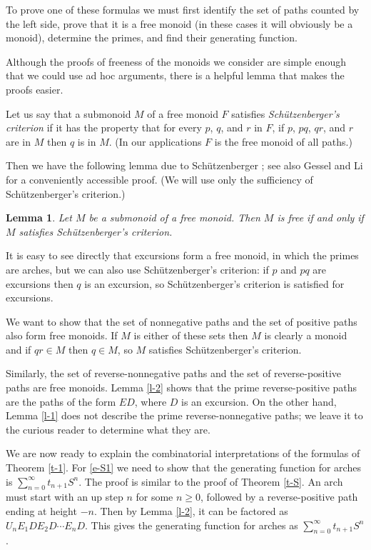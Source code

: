 \documentclass[12pt,reqno, oneside]{amsart}
\newtheorem{lem}[thm]{Lemma}
\newcommand{\Sch}{Sch\"utzenberger}
\begin{document}
To prove one of these formulas we must first identify the set of paths counted by the left side, prove that it is a free monoid (in these cases it will obviously be a monoid),  determine the primes, and find their generating function.

Although the proofs of freeness of the monoids we consider are simple enough that we could use ad hoc arguments, there is a helpful lemma that makes the proofs easier.

Let us say that a submonoid $M$ of a free monoid $F$ satisfies \emph{Sch\"utzenberger's criterion} if it has the property that for every $p$, $q$, and $r$ in $F$, if $p$, $pq$, $qr$, and $r$ are in $M$ then $q$ is in $M$. (In our applications $F$ is the free monoid of all paths.)

Then we have the following lemma due to Sch\"utzenberger \cite[Theorem 1.4]{schutzenberger}; see also Gessel and Li \cite[Lemma 3]{gl} for a conveniently accessible proof.  (We will  use only the sufficiency of Sch\"utzenberger's criterion.)
\begin{lem}
\label{l-schutz}
Let $M$ be a submonoid of a free monoid.
Then $M$ is free if and only if $M$ satisfies Sch\"utzenberger's criterion.
\end{lem}

It is easy to see directly that excursions form a free monoid, in which the primes are arches, but we can also use Sch\"utzenberger's criterion: if $p$ and $pq$ are excursions then $q$ is an excursion, so \Sch's criterion is satisfied for excursions.

We want to show that the set of nonnegative paths and the set of positive paths also form free monoids. If $M$ is either of these sets then $M$ is clearly a monoid and  if $qr\in M$ then $q\in M$, so  $M$ satisfies \Sch's criterion.

Similarly, the set of reverse-nonnegative paths and the set of reverse-positive paths are free monoids. Lemma \ref{l-2} shows that the prime reverse-positive paths are the paths of the form $ED$, where $D$ is an excursion. On the other hand, Lemma \ref{l-1} does not describe the prime reverse-nonnegative paths; we leave it to the curious reader to determine what they are. 

We are now ready to explain the combinatorial interpretations of the formulas of Theorem \ref{t-1}.
For \eqref{e-S1} we need to show that the generating function for arches is $\sum_{n=0}^\infty t_{n+1} S^{n}$. The proof is   similar to the proof of Theorem \ref{t-S}. An arch must start with an up step $n$ for some $n\ge0$, followed by a reverse-positive path ending at height $-n$. Then by Lemma \ref{l-2}, it can be factored as $U_n E_1 D E_2 D \cdots E_n D$. This gives the generating function for arches as
$\sum_{n=0}^{\infty} t_{n+1}S^{n}$.
\end{document}
